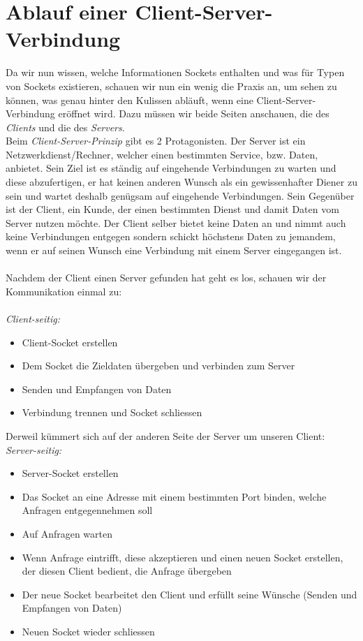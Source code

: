 \documentclass[b5paper,10pt,dvips,fleqn,titlepage,twoside]{book}
\begin{document}
\section{Ablauf einer Client-Server-Verbindung}
Da wir nun wissen, welche Informationen Sockets enthalten und was für Typen von Sockets existieren, schauen wir nun ein wenig die Praxis an, um sehen zu können, was genau hinter den Kulissen abläuft, wenn eine Client-Server-Verbindung eröffnet wird. Dazu müssen wir beide Seiten anschauen, die des \emph{Clients} und die des \emph{Servers}.\\
Beim \emph{Client-Server-Prinzip} gibt es 2 Protagonisten. Der Server ist ein Netzwerkdienst/Rechner, welcher einen bestimmten Service, bzw. Daten, anbietet. Sein Ziel ist es ständig auf eingehende Verbindungen zu warten und diese abzufertigen, er hat keinen anderen Wunsch als ein gewissenhafter Diener zu sein und wartet deshalb genügsam auf eingehende Verbindungen. Sein Gegenüber ist der Client, ein Kunde, der einen bestimmten Dienst und damit Daten vom Server nutzen möchte. Der Client selber bietet keine Daten an und nimmt auch keine Verbindungen entgegen sondern schickt höchstens Daten zu jemandem, wenn er auf seinen Wunsch eine Verbindung mit einem Server eingegangen ist.\\\\
Nachdem der Client einen Server gefunden hat geht es los, schauen wir der Kommunikation einmal zu:
\\\\
\textit{Client-seitig:}\\
\begin{itemize}
\item Client-Socket erstellen
\item Dem Socket die Zieldaten übergeben und verbinden zum Server
\item Senden und Empfangen von Daten
\item Verbindung trennen und Socket schliessen
\end{itemize}
Derweil kümmert sich auf der anderen Seite der Server um unseren Client:
\newpage
\textit{Server-seitig:}\\
\begin{itemize}
 \item Server-Socket erstellen
\item Das Socket an eine Adresse mit einem bestimmten Port binden, welche Anfragen entgegennehmen soll
\item Auf Anfragen warten
\item Wenn Anfrage eintrifft, diese akzeptieren und einen neuen Socket erstellen, der diesen Client bedient, die Anfrage übergeben
\item Der neue Socket bearbeitet den Client und erfüllt seine Wünsche (Senden und Empfangen von Daten)
\item Neuen Socket wieder schliessen
\end{itemize}
\end{document}
